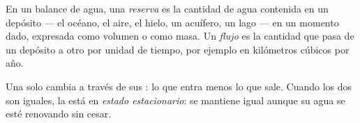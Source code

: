 \begin{definition}\label{def:g10:freshwater-resources:stock}
En un balance de agua, una \emph{reserva} es la
cantidad de agua contenida en un depósito --- el océano, el aire, el hielo,
un acuífero, un lago --- en un momento dado, expresada como volumen o como
masa. Un \emph{flujo} es la cantidad que pasa de un depósito a otro por unidad
de tiempo, por ejemplo en kilómetros cúbicos por año.
\end{definition}

Una  solo cambia a través de sus : lo que entra menos lo que
sale. Cuando los dos son iguales, la  está en \emph{estado
estacionario}: se mantiene igual aunque su agua se esté renovando sin cesar.


